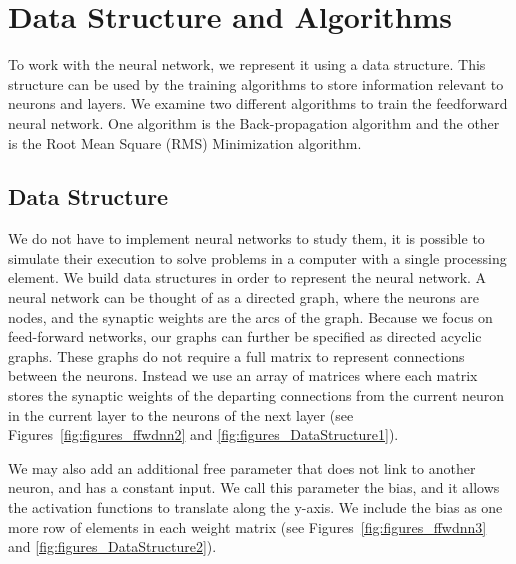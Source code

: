 \documentclass[11pt]{article}
\begin{document}


\section{Data Structure and Algorithms} %
\label{sec:data_structure_and_algorithms}

To work with the neural network, we represent it using a data structure. This structure can be used by the training algorithms to store
information relevant to neurons and layers. We examine two different algorithms to train the feedforward neural network. One algorithm
is the Back-propagation algorithm and the other is the Root Mean Square (RMS) Minimization algorithm.

\subsection{Data Structure} %
\label{sub:data_structure}

We do not have to implement neural networks to study them, it is possible to simulate their execution to solve problems in a computer
with a single processing element. We build data structures in order to represent the neural network. A neural network can be thought of
as a directed graph, where the neurons are nodes, and the synaptic weights are the arcs of the graph. Because we focus on feed-forward
networks, our graphs can further be specified as directed acyclic graphs. These graphs do not require a full matrix to represent
connections between the neurons. Instead we use an array of matrices where each matrix stores the synaptic weights of the departing
connections from the current neuron in the current layer to the neurons of the next layer (see Figures~\ref{fig:figures_ffwdnn2} and
\ref{fig:figures_DataStructure1}).

We may also add an additional free parameter that does not link to another neuron, and has a constant input. We call this parameter the
bias, and it allows the activation functions to translate along the y-axis. We include the bias as one more row of elements in each
weight matrix (see Figures~\ref{fig:figures_ffwdnn3} and \ref{fig:figures_DataStructure2}).
\end{document}
